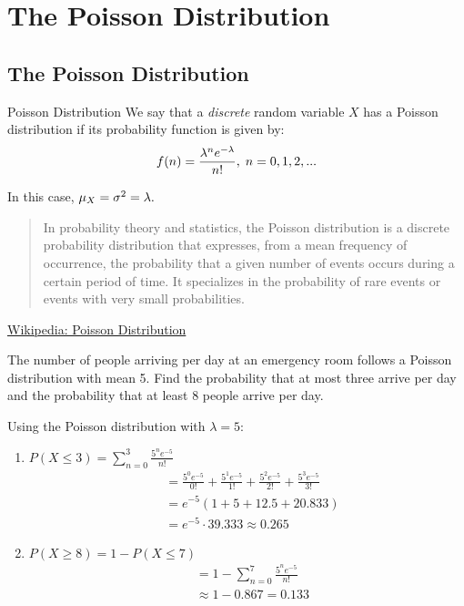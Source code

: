 \section{The Poisson Distribution}
\subsection{The Poisson Distribution}

{Poisson Distribution} We say that a \emph{discrete} random variable $X$ has a Poisson distribution if its probability function is given by:
 \begin{align}
  \label{eq:2.10.7}
  f(n)=\dfrac{\lambda^{n}e^{-\lambda}}{n!}, \; n=0,1,2,...
 \end{align}

In this case, $\mu_{X}=\sigma^{2}=\lambda.$

\begin{quote}
 In probability theory and statistics, the Poisson distribution is a discrete probability distribution that expresses, from a mean frequency of occurrence, the probability that a given number of events occurs during a certain period of time. It specializes in the probability of rare events or events with very small probabilities.
\end{quote}

\href{https://en.wikipedia.org/wiki/Poisson_distribution}{Wikipedia: Poisson Distribution}

\begin{ejemplo}
  \label{exmp:2.10.5}
  The number of people arriving per day at an emergency room follows a Poisson distribution with mean 5. Find the probability that at most three arrive per day and the probability that at least 8 people arrive per day.
\end{ejemplo}

\begin{solucion}
	Using the Poisson distribution with $\lambda = 5$:

	\begin{enumerate}
		\item $P(X \leq 3) = \sum_{n=0}^{3} \frac{5^n e^{-5}}{n!}$
		\begin{align}
			&= \frac{5^0 e^{-5}}{0!} + \frac{5^1 e^{-5}}{1!} + \frac{5^2 e^{-5}}{2!} + \frac{5^3 e^{-5}}{3!} \\
			&= e^{-5}(1 + 5 + 12.5 + 20.833) \\
			&= e^{-5} \cdot 39.333 \approx 0.265
		\end{align}

		\item $P(X \geq 8) = 1 - P(X \leq 7)$
		\begin{align}
			&= 1 - \sum_{n=0}^{7} \frac{5^n e^{-5}}{n!} \\
			&\approx 1 - 0.867 = 0.133
		\end{align}
	\end{enumerate}
\end{solucion}

